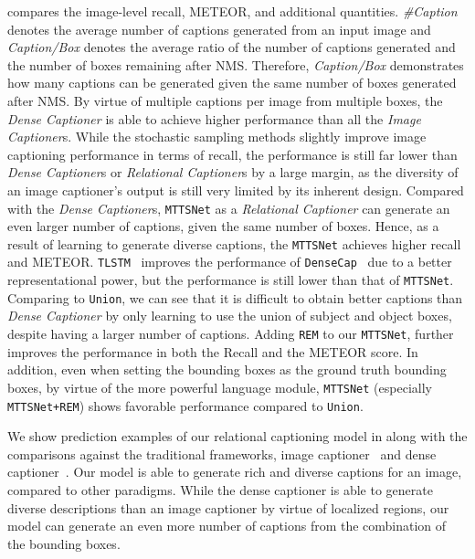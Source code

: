  {compares} the image-level recall, METEOR, and additional quantities. 
\emph{\#Caption} denotes the average number of captions generated from an input image and \emph{Caption/Box} denotes the average ratio of the number of captions generated and the number of boxes remaining after NMS.
Therefore, \emph{Caption/Box} demonstrates how many captions can be generated given the same number of boxes generated after NMS.
By virtue of multiple captions per image from multiple boxes, the \emph{Dense Captioner} is able to achieve higher performance than {all  the} \emph{Image Captioner}s. 
{While {the} stochastic sampling {methods slightly improve} 
image captioning performance in terms of recall, 
the performance is still far lower than \emph{Dense Captioner}s or \emph{Relational Captioner}s by a large margin,
{as the diversity of an image captioner's output is still very limited by its inherent design.}
}
Compared with the \emph{Dense Captioner}s, \texttt{MTTSNet} as a \emph{Relational Captioner} can generate an even larger number of captions, given the same number of boxes.
Hence, as a result of learning to generate diverse captions, the \texttt{MTTSNet} achieves higher recall and METEOR.
{\texttt{TLSTM}~\cite{Yang_2017_CVPR} 
improves the performance 
of
\texttt{DenseCap}~\cite{johnson2016densecap} 
due to a better representational power, but the performance is still lower than that of \texttt{MTTSNet}.}
Comparing to
\texttt{Union}, we can see that it is difficult to obtain better captions than \emph{Dense Captioner} by only learning to use the union of subject and object boxes, despite having a larger number of captions.
{Adding \texttt{REM} {to our \texttt{MTTSNet},} further 
improves
the performance in both the Recall and the METEOR score.}
{In addition, even when setting the bounding boxes as the ground truth bounding boxes, by virtue of the more powerful language module, \texttt{MTTSNet} (especially \texttt{MTTSNet+REM}) shows favorable performance compared to \texttt{Union}.}



We show prediction examples of our relational captioning model in  {along with the comparisons against the traditional frameworks, image captioner~\cite{vinyals2015show} and dense captioner~\cite{johnson2016densecap}.}
Our model is able to generate rich and diverse captions for an image, {compared to other paradigms.}
While the dense captioner is able to generate diverse descriptions than an image captioner by virtue of {localized} regions, our model can generate an even more number of captions from the combination of the bounding boxes.





